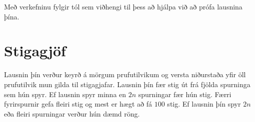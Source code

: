 Með verkefninu fylgir tól sem viðhengi til þess að hjálpa við að prófa lausnina þína.

\section*{Stigagjöf}
Lausnin þín verður keyrð á mörgum prufutilvikum og versta niðurstaða yfir
öll prufutilvik mun gilda til stigagjafar.
Lausnin þín fær stig út frá fjölda spurninga sem hún spyr.
Ef lausnin spyr minna en $2n$ spurningar fær hún stig.
Færri fyrirspurnir gefa fleiri stig og mest er hægt að fá $100$ stig.
Ef lausnin þín spyr $2n$ eða fleiri spurningar verður hún dæmd röng.
